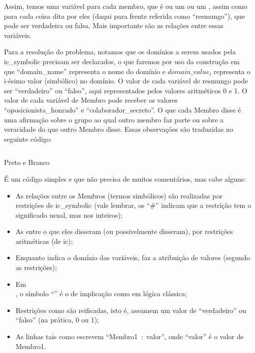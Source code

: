 Assim, temos uma variável para cada membro, que é ou um  ou um
, assim como para cada coisa dita por eles (daqui para frente referida como
``resmungo''), que pode ser verdadeira ou falsa. Mais importante são as relações entre essas
variáveis.

Para a resolução do problema, notamos que os domínios a serem usados pela ic\_symbolic precisam ser
declarados, o que faremos por uso da construção  em que ``domain\_name''
representa o nome do domínio e $domain\_value_i$ representa o i-ésimo valor (simbólico) no domínio.
O valor de cada variável de resmungo pode ser ``verdadeiro'' ou ``falso'', aqui representados pelos
valores aritméticos 0 e 1. O valor de cada variável de Membro pode receber os valores
``oposicionista\_honrado'' e ``colaborador\_secreto''. O que cada Membro disse é uma afirmação sobre
o grupo ao qual outro membro faz parte ou sobre a veracidade do que outro Membro disse. Essas
observações são traduzidas no seguinte código:

    \begin{listing}[!h]
\inputminted{prolog}{../Exemplos/Cap10/prog1_pretoEbranco.ecl}
\caption{Preto e Branco}
    \end{listing}

É um código simples e que não precisa de muitos comentários, mas cabe alguns:

\begin{itemize}
  \item As relações entre os Membros (termos simbólicos) são realizadas por restrições de
    ic\_symbolic (vale lembrar, os ``\#'' indicam que a restrição tem o significado usual, mas nos inteiros);
  \item As entre o que eles disseram (ou possivelmente disseram), por restrições aritméticas (de
    ic);
  \item Enquanto  indica o domínio
    das variáveis,  faz a atribuição de valores (segundo as
    restrições);
  \item Em  \\,
    o símbolo ``\codigo{=>}'' é o de implicação como em lógica clássica;
  \item Restrições como  são reificadas, isto é, assumem
    um valor de ``verdadeiro'' ou ``falso'' (na prática, 0 ou 1);
  \item As linhas tais como  escrevem ``Membro1~:~valor'',
    onde ``valor'' é o valor de Membro1.
\end{itemize}

